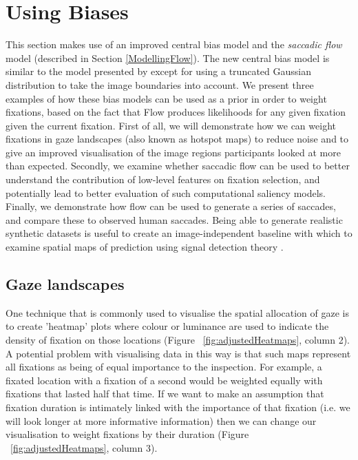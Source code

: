 
\section{Using Biases}
\label{sec:usingbiases}

This section makes use of an improved central bias model and the \textit{saccadic flow} model (described in Section \ref{ModellingFlow}). The new central bias model is similar to the model presented by \cite{clarke-tatler2014} except for using a truncated Gaussian distribution to take the image boundaries into account. We present three examples of how these bias models can be used as a prior in order to weight fixations, based on the fact that Flow produces likelihoods for any given fixation given the current fixation. First of all, we will demonstrate how we can weight fixations in gaze landscapes (also known as hotspot maps) to reduce noise and to give an improved visualisation of the image regions participants looked at more than expected. Secondly, we examine whether saccadic flow can be used to better understand the contribution of low-level features on fixation selection, and potentially lead to better evaluation of such computational saliency models. Finally, we demonstrate how flow can be used to generate a series of saccades, and compare these to observed human saccades. Being able to generate realistic synthetic datasets is useful to create an image-independent baseline with which to examine spatial maps of prediction using signal detection theory \citep[see][]{clarke-tatler2014}.

\subsection{Gaze landscapes}

One technique that is commonly used to visualise the spatial allocation of gaze is to create 'heatmap' plots where colour or luminance are used to indicate the density of fixation on those locations (Figure ~\ref{fig:adjustedHeatmaps}, column 2). A potential problem with visualising data in this way is that such maps represent all fixations as being of equal importance to the inspection. For example, a fixated location with a fixation of a second would be weighted equally with fixations that lasted half that time. If we want to make an assumption that fixation duration is intimately linked with the importance of that fixation (i.e. we will look longer at more informative information) then we can change our visualisation to weight fixations by their duration (Figure ~\ref{fig:adjustedHeatmaps}, column 3).

